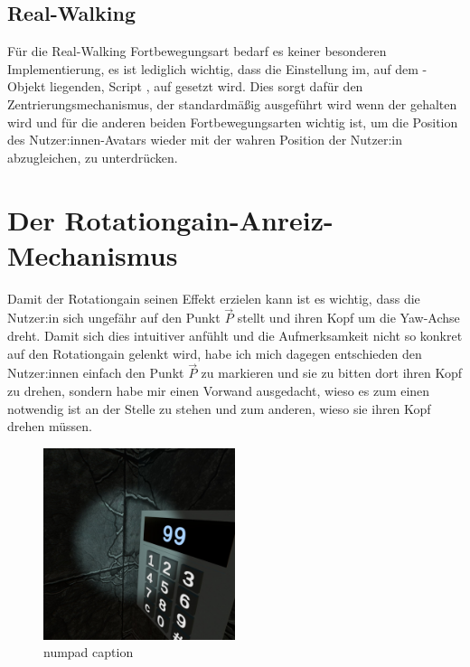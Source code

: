\subsection{Real-Walking}\label{subsec:real-walk-implementation}
    Für die Real-Walking Fortbewegungsart bedarf es keiner besonderen Implementierung, es ist lediglich wichtig, dass die Einstellung  im, auf dem -Objekt
    liegenden, Script , auf  gesetzt wird. Dies sorgt dafür den Zentrierungsmechanismus, der standardmäßig ausgeführt wird wenn der  gehalten wird und für die anderen beiden Fortbewegungsarten wichtig ist, um die Position des Nutzer:innen-Avatars wieder mit der wahren Position der Nutzer:in abzugleichen, zu unterdrücken.

\section{Der Rotationgain-Anreiz-Mechanismus}
\label{sec:rotgaininc}

Damit der Rotationgain seinen Effekt erzielen kann ist es wichtig, dass die Nutzer:in sich ungefähr auf den Punkt $\vec{P}$ stellt und ihren Kopf um die Yaw-Achse dreht.
Damit sich dies intuitiver anfühlt und die Aufmerksamkeit nicht so konkret auf den Rotationgain gelenkt wird, habe ich mich dagegen entschieden den Nutzer:innen einfach den Punkt $\vec{P}$ zu markieren und sie zu bitten dort ihren Kopf zu drehen, sondern habe mir einen Vorwand ausgedacht, wieso es zum einen notwendig ist an der Stelle zu stehen und zum anderen, wieso sie ihren Kopf drehen müssen.

\begin{figure}[!h]
    \centering
    \includegraphics[width=0.5\textwidth]{vrscreenshots/numpad.jpg}
    \caption{numpad caption}\label{figure:numpad}
\end{figure}

